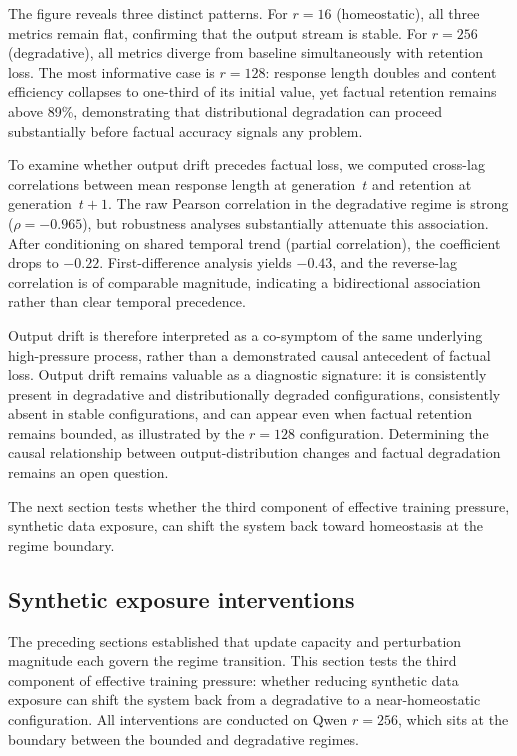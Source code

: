 \documentclass[a4paper,fleqn]{cas-dc}
\begin{document}
The figure reveals three distinct patterns. For $r=16$ (homeostatic), all three
metrics remain flat, confirming that the output stream is stable. For $r=256$
(degradative), all metrics diverge from baseline simultaneously with retention
loss. The most informative case is $r=128$: response length doubles and content
efficiency collapses to one-third of its initial value, yet factual retention
remains above 89\%, demonstrating that distributional degradation can proceed
substantially before factual accuracy signals any problem.

To examine whether output drift precedes factual loss, we computed cross-lag
correlations between mean response length at generation~$t$ and retention at
generation~$t{+}1$. The raw Pearson correlation in the degradative regime is
strong ($\rho = -0.965$), but robustness analyses substantially attenuate this
association. After conditioning on shared temporal trend (partial correlation),
the coefficient drops to $-0.22$. First-difference analysis yields $-0.43$, and
the reverse-lag correlation is of comparable magnitude, indicating a
bidirectional association rather than clear temporal precedence.

Output drift is therefore interpreted as a co-symptom of the same underlying
high-pressure process, rather than a demonstrated causal antecedent of factual
loss. Output drift remains valuable as a diagnostic signature: it is
consistently present in degradative and distributionally degraded configurations,
consistently absent in stable configurations, and can appear even when factual
retention remains bounded, as illustrated by the $r=128$ configuration.
Determining the causal relationship between output-distribution changes and
factual degradation remains an open question.

The next section tests whether the third component of effective training
pressure, synthetic data exposure, can shift the system back toward homeostasis
at the regime boundary.

\subsection{Synthetic exposure interventions}\label{sec:res_intervention}

The preceding sections established that update capacity and perturbation
magnitude each govern the regime transition. This section tests the third
component of effective training pressure: whether reducing synthetic data
exposure can shift the system back from a degradative to a near-homeostatic
configuration. All interventions are conducted on Qwen $r=256$, which sits at
the boundary between the bounded and degradative regimes.
\end{document}
